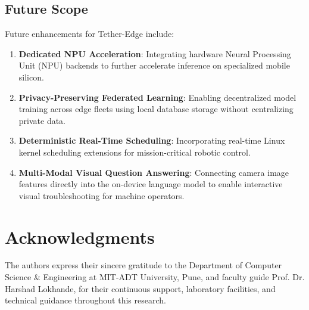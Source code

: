\documentclass[conference]{IEEEtran}
\begin{document}
    \subsection{Future Scope}
    Future enhancements for Tether-Edge include:
    \begin{enumerate}
        \item \textbf{Dedicated NPU Acceleration}: Integrating hardware Neural Processing Unit (NPU) backends to further accelerate inference on specialized mobile
        silicon.
        \item \textbf{Privacy-Preserving Federated Learning}: Enabling decentralized model training across edge fleets using local database storage without
        centralizing private data.
        \item \textbf{Deterministic Real-Time Scheduling}: Incorporating real-time Linux kernel scheduling extensions for mission-critical robotic control.
        \item \textbf{Multi-Modal Visual Question Answering}: Connecting camera image features directly into the on-device language model to enable interactive
        visual troubleshooting for machine operators.
    \end{enumerate}
    
    \section*{Acknowledgments}
    The authors express their sincere gratitude to the Department of Computer Science \& Engineering at MIT-ADT University, Pune, and faculty guide Prof. Dr.
    Harshad Lokhande, for their continuous support, laboratory facilities, and technical guidance throughout this research.
    
\end{document}

